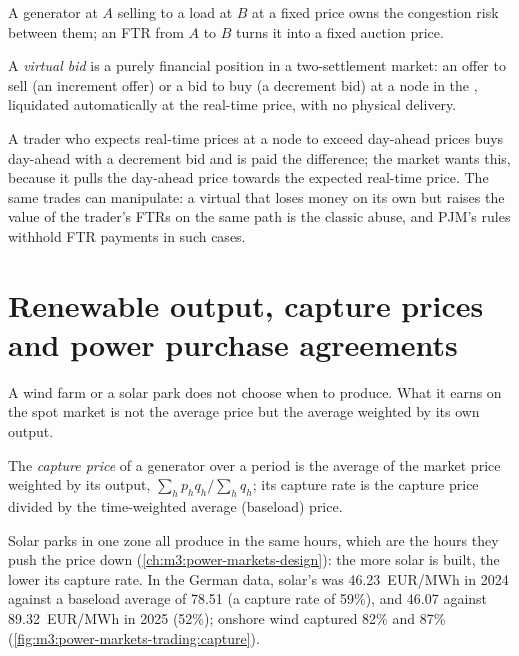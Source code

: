 A generator at $A$ selling to a load at $B$ at a fixed price owns the congestion risk between
them; an FTR from $A$ to $B$ turns it into a fixed auction price.

\begin{definition}\label{def:m3:power-markets-trading:virtual}
A \emph{virtual bid} is a purely financial position in a two-settlement
market: an offer to sell (an increment offer) or a bid to buy (a decrement bid) at a node in
the , liquidated automatically at the real-time price, with no physical
delivery.
\end{definition}

A trader who expects real-time prices at a node to exceed day-ahead prices buys day-ahead with
a decrement bid and is paid the difference; the market wants this, because it pulls the
day-ahead price towards the expected real-time price. The same trades can manipulate: a
virtual that loses money on its own but raises the value of the trader's FTRs on the same path
is the classic abuse, and PJM's rules withhold FTR payments in such cases.

\section{Renewable output, capture prices and power purchase agreements}

A wind farm or a solar park does not choose when to produce. What it earns on the spot
market is not the average price but the average weighted by its own output.

\begin{definition}\label{def:m3:power-markets-trading:capture}
The \emph{capture price} of a generator over a period is the average of
the market price weighted by its output, $\sum_h p_h q_h / \sum_h q_h$; its capture rate is
the capture price divided by the time-weighted average (baseload) price.
\end{definition}

Solar parks in one zone all produce in the same hours, which are the hours they push the
price down (\cref{ch:m3:power-markets-design}): the more solar is built, the lower its capture
rate. In the German data, solar's  was \qty{46.23}{EUR/MWh} in 2024 against a
baseload average of \qty{78.51}{} (a capture rate of 59\%), and \qty{46.07}{} against
\qty{89.32}{EUR/MWh} in 2025 (52\%); onshore wind captured 82\% and 87\%
(\cref{fig:m3:power-markets-trading:capture}).

